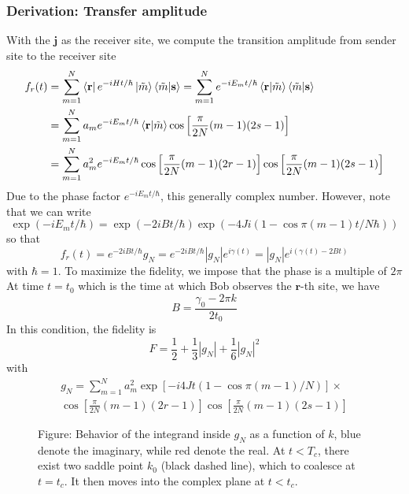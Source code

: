 \documentclass[../../../main.tex]{subfiles}
\begin{document}
\subsubsection{Derivation: Transfer amplitude}
With the $\mathbf{j}$ as the receiver site, we compute the transition amplitude from sender site to the receiver site
\begin{align*}
  f_r (t)
   & = \sum_{m=1 } ^N  \bra{\mathbf{r}} e ^{-iHt/\hbar } \ket{\tilde{m }} \braket{\tilde{m }  | \mathbf{s}}
  = \sum_{m=1 } ^N  e ^{-iE_mt/\hbar }  \braket{\mathbf{r }  | \tilde{m}} \braket{\tilde{m }  | \mathbf{s}}                                          \\
   & = \sum_{m=1 } ^N  a_m e ^{-iE_m t/\hbar } \braket{\mathbf{r}|\tilde{m }} \cos \left[ \frac{\pi }{2N }(m-1 ) (2s-1) \right]                      \\
   & = \sum_{m=1 } ^N  a_m^2  e ^{-iE_m t/\hbar }\cos \left[ \frac{\pi }{2N }(m-1 ) (2r-1) \right] \cos \left[ \frac{\pi }{2N }(m-1 ) (2s-1) \right]
\end{align*}
Due to the phase factor $e ^{-i E_m t/\hbar}$, this generally complex number.
However, note that we can write
\begin{equation*}
  \exp \left( -i E_m t/\hbar \right) =   \exp(-2iBt/\hbar ) \exp \left( -4Ji (1 - \cos \pi(m-1) t/N \hbar ) \right)
\end{equation*}
so that
\begin{equation*}
  f_r(t) = e ^{-2iBt/\hbar } g_N  = e ^{-2iBt/\hbar } | g_N | e ^{i\gamma(t)} = |g_N| e ^{i(\gamma(t)-2Bt)}
\end{equation*}
with $\hbar = 1$.
To maximize the fidelity, we impose that the phase is a multiple of $2\pi$
At time $t=t_0$ which is the time at which Bob observes the $\mathbf{r}$-th site, we have
\begin{equation*}
  B = \frac{\gamma_0- 2\pi k }{2 t_0}
\end{equation*}
In this condition, the fidelity is
\begin{equation*}
  F = \frac{1 }{2 }+ \frac{1 }{3 }|g_N| + \frac{1 }{6 }|g_N|^2
\end{equation*}
with
\begin{multline*}
  g_N = \sum_{m=1 } ^N  a_m^2 \exp \left[ -i4Jt (1 - \cos \pi(m-1) /N ) \right]  \times\\
  \cos \left[ \frac{\pi }{2N }(m-1 ) (2r-1) \right] \cos \left[ \frac{\pi }{2N }(m-1 ) (2s-1) \right]
\end{multline*}

\begin{figure}
  \centering
  \caption*{Figure: Behavior of the integrand inside $g_N$ as a function of $k$, blue denote the imaginary, while red denote the real. At $t < T_c$, there exist two saddle point $k_0$ (black dashed line), which to coalesce at $t = t_c$. It then moves into the complex plane at $t<t_c$.}
\end{figure}
\end{document}
